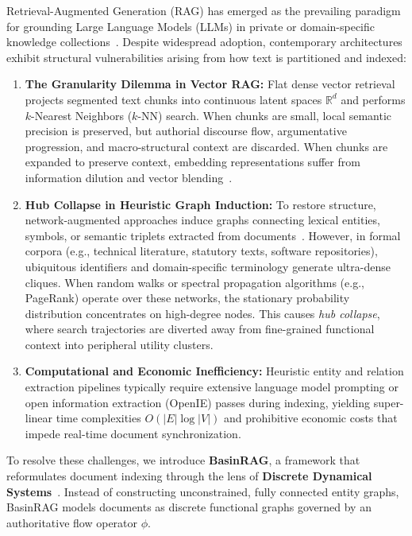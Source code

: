 \documentclass[10pt,twocolumn]{article}
\theoremstyle{definition}
\begin{document}
Retrieval-Augmented Generation (RAG) has emerged as the prevailing paradigm for grounding Large Language Models (LLMs) in private or domain-specific knowledge collections~\cite{lewis2020retrieval,guu2020realm}. Despite widespread adoption, contemporary architectures exhibit structural vulnerabilities arising from how text is partitioned and indexed:

\begin{enumerate}
    \item \textbf{The Granularity Dilemma in Vector RAG:} Flat dense vector retrieval projects segmented text chunks into continuous latent spaces $\mathbb{R}^d$ and performs $k$-Nearest Neighbors ($k$-NN) search. When chunks are small, local semantic precision is preserved, but authorial discourse flow, argumentative progression, and macro-structural context are discarded. When chunks are expanded to preserve context, embedding representations suffer from information dilution and vector blending~\cite{karpukhin2020dense,gao2023modular}.
    \item \textbf{Hub Collapse in Heuristic Graph Induction:} To restore structure, network-augmented approaches induce graphs connecting lexical entities, symbols, or semantic triplets extracted from documents~\cite{pan2024unifying}. However, in formal corpora (e.g., technical literature, statutory texts, software repositories), ubiquitous identifiers and domain-specific terminology generate ultra-dense cliques. When random walks or spectral propagation algorithms (e.g., PageRank) operate over these networks, the stationary probability distribution concentrates on high-degree nodes. This causes \textit{hub collapse}, where search trajectories are diverted away from fine-grained functional context into peripheral utility clusters.
    \item \textbf{Computational and Economic Inefficiency:} Heuristic entity and relation extraction pipelines typically require extensive language model prompting or open information extraction (OpenIE) passes during indexing, yielding super-linear time complexities $O(|E| \log |V|)$ and prohibitive economic costs that impede real-time document synchronization.
\end{enumerate}

To resolve these challenges, we introduce \textbf{BasinRAG}, a framework that reformulates document indexing through the lens of \textbf{Discrete Dynamical Systems}~\cite{martins2026iterated}. Instead of constructing unconstrained, fully connected entity graphs, BasinRAG models documents as discrete functional graphs governed by an authoritative flow operator $\phi$. 
\end{document}
